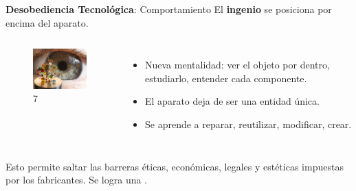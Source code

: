 \documentclass[spanish]{beamer}
\begin{document}
\begin{frame}{\textbf{Desobediencia Tecnológica}: Comportamiento}        
    El \textbf{ingenio} se posiciona por encima del aparato.    
    \vspace*{-3mm}
    \begin{columns}
            \begin{figure}
                \centering
                \includegraphics[width=3.5cm]{img/complejidad.jpg}
                \caption{ 7}
            \end{figure}
            \begin{itemize}
                \item Nueva mentalidad: ver el objeto por dentro, estudiarlo, entender cada componente.
                \item El aparato deja de ser una entidad única.
                \item Se aprende a reparar, reutilizar, modificar, crear.
            \end{itemize}
    \end{columns}
    \vspace{0.3cm}
    Esto permite saltar las barreras éticas, económicas, legales y estéticas impuestas por los fabricantes.
    Se logra una .
\end{frame}
\end{document}
